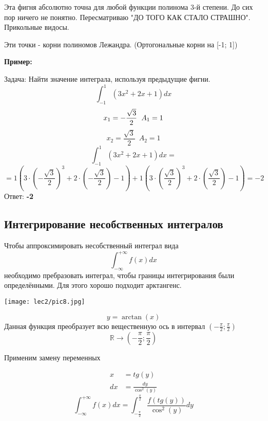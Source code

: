 \documentclass[12pt]{article}
\begin{document}
\begin{itemize}
\begin{itemize}
        Эта фигня абсолютно точна для любой функции полинома 3-й степени.
        До сих пор ничего не понятно. Пересматриваю "ДО ТОГО КАК СТАЛО СТРАШНО".
        Прикольные видосы.

        Эти точки - корни полиномов Лежандра. (Ортогональные корни на [-1; 1])

        \newpage
        \textbf{Пример:}

        Задача: Найти значение интеграла, используя предыдущие фигни.
        \[
          \int_{-1}^{1} (3x^2+2x+1)dx
        \] 
        \[
          x_{1} = - \frac{\sqrt{3}}{2} \hspace{6pt} A_{1} = 1 \\
        \]
        \[
          x_{2} = \frac{\sqrt{3}}{2} \hspace{6pt} A_{2} = 1
        \] 
        \[
          \int_{-1}^{1} (3x^2+2x+1)dx =
        \] 
        \[
          = 1 \left( 3 \cdot \left( -\frac{\sqrt{3}}{2} \right)^3 +
          2 \cdot \left( -\frac{\sqrt{3}}{2} \right) - 1\right) +
          1 \left( 3 \cdot \left( \frac{\sqrt{3}}{2} \right)^3 +
          2 \cdot \left(\frac{\sqrt{3}}{2} \right) - 1\right) = -2
        \] 
        Ответ: \textbf{-2}
    \end{itemize}
\end{itemize}
\subsection{Интегрирование несобственных интегралов}

Чтобы аппроксимировать несобственный интеграл вида
\[
  \int_{-\infty}^{+\infty} f(x)dx
\] 
необходимо пребразовать интеграл, чтобы границы интегрирования были
определёнными. Для этого хорошо подходит арктангенс.
\begin{center}
	\texttt{[image: lec2/pic8.jpg]}
\end{center}
\[
  y = \arctan(x)
\] 
Данная функция преобразует всю вещественную ось
в интервал \( \left( -\frac{\pi}{2}; \frac{\pi}{2} \right) \)
\[
  \mathbb{R} \to \left( -\frac{\pi}{2}; \frac{\pi}{2} \right)
\] 

Применим замену переменных

\begin{align*}
  x &= tg(y) \\
  dx &= \frac{dy}{\cos^2(y)}
\end{align*}
\[
  \displaystyle\int_{-\infty}^{+\infty} f(x)dx =
  \int_{-\frac{\pi}{2}}^{\frac{\pi}{2}} \frac{f(tg(y))}{\cos^2(y)}dy
\] 
\end{document}
